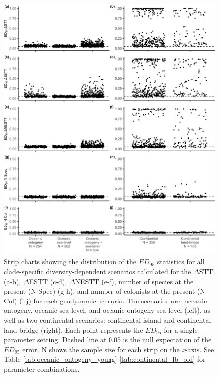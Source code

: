 \begin{figure}
    \centering
    \includegraphics[width=\textwidth]{JBI-21-0508_FigS4.png}
    \caption{Strip charts showing the distribution of the $ED_{95}$ statistics for all clade-specific diversity-dependent scenarios calculated for the $\Delta$STT (a-b), $\Delta$ESTT (c-d), $\Delta$NESTT (e-f), number of species at the present (N Spec) (g-h), and number of colonists at the present (N Col) (i-j) for each geodynamic scenario. The scenarios are: oceanic ontogeny, oceanic sea-level, and oceanic ontogeny sea-level (left), as well as two continental scenarios: continental island and continental land-bridge (right). Each point represents the $ED_{95}$ for a single parameter setting. Dashed line at 0.05 is the null expectation of the $ED_{95}$ error. N shows the sample size for each strip on the \textit{x}-axis. See Table \ref{tab:oceanic_ontogeny_young}-\ref{tab:continental_lb_old} for parameter combinations.}
    \label{fig:facet_scenario_cs}
\end{figure}

